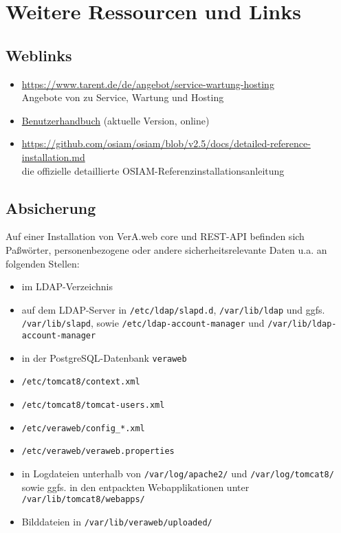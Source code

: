 \documentclass{tarentanleitung}
\begin{document}
\section{Weitere Ressourcen und Links}\label{sec:links}

\subsection{Weblinks}\label{subsec:links-web}

\begin{itemize}
 \item{\href{https://www.tarent.de/de/angebot/service-wartung-hosting}{https://www.tarent.de/de/angebot/service-wartung-hosting}
  \\ Angebote von \tarent{} zu Service, Wartung und Hosting}
 \item{\href{https://evolvis.org/plugins/scmgit/cgi-bin/gitweb.cgi?p=veraweb/veraweb.git;a=blob_plain;f=vwor/src/main/webapp/doc/Benutzerhandbuch.pdf;hb=HEAD}{Benutzerhandbuch}
  (aktuelle Version, online)}
 \item{\href{https://github.com/osiam/osiam/blob/v2.5/docs/detailed-reference-installation.md}{https://github.com/osiam/osiam/blob/v2.5/docs/detailed-reference-installation.md}
  \\ die offizielle detaillierte OSIAM-Referenzinstallationsanleitung}
\end{itemize}

\subsection{Absicherung}\label{subsec:links-sec}

Auf einer Installation von VerA.web core und REST-API befinden sich
Paßwörter, personenbezogene oder andere sicherheitsrelevante Daten
u.a. an folgenden Stellen:\keinumbruch

\begin{itemize}
 \item{im LDAP-Verzeichnis}
 \item{auf dem LDAP-Server in \texttt{/etc/ldap/slapd.d},
  \texttt{/var/lib/ldap} und ggfs. \texttt{/var/lib/slapd},
  sowie \texttt{/etc/ldap-account-manager} und
  \texttt{/var/lib/ldap-account-manager}}
 \item{in der PostgreSQL-Datenbank \texttt{veraweb}}
 \item{\texttt{/etc/tomcat8/context.xml}}
 \item{\texttt{/etc/tomcat8/tomcat-users.xml}}
 \item{\texttt{/etc/veraweb/config\_*.xml}}
 \item{\texttt{/etc/veraweb/veraweb.properties}}
 \item{in Logdateien unterhalb von \texttt{/var/log/apache2/}
  und \texttt{/var/log/tomcat8/} sowie ggfs. in den entpackten
  Webapplikationen unter \texttt{/var/lib/tomcat8/webapps/}}
 \item{Bilddateien in \texttt{/var/lib/veraweb/uploaded/}}
\end{itemize}
\end{document}
